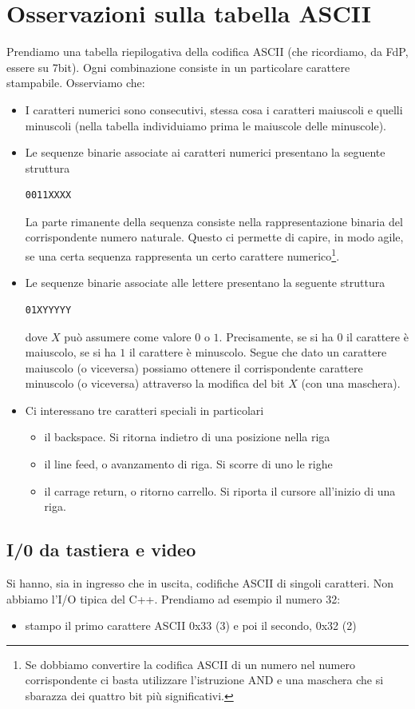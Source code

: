 \documentclass[11pt]{report}
\begin{document}
\section{Osservazioni sulla tabella ASCII}
Prendiamo una tabella riepilogativa della codifica ASCII (che ricordiamo, da FdP, essere su 7bit). Ogni combinazione consiste in un particolare carattere stampabile. Osserviamo che:
\begin{itemize}
\item I caratteri numerici sono consecutivi, stessa cosa i caratteri maiuscoli e quelli minuscoli (nella tabella individuiamo prima le maiuscole delle minuscole).
\item Le sequenze binarie associate ai caratteri numerici presentano la seguente struttura
\begin{verbatim}
0011XXXX
\end{verbatim}
La parte rimanente della sequenza consiste nella rappresentazione binaria del corrispondente numero naturale. Questo ci permette di capire, in modo agile, se una certa sequenza rappresenta un certo carattere numerico\footnote{Se dobbiamo convertire la codifica ASCII di un numero nel numero corrispondente ci basta utilizzare l'istruzione AND e una maschera che si sbarazza dei quattro bit più significativi.}.
\item Le sequenze binarie associate alle lettere presentano la seguente struttura
\begin{verbatim}
01XYYYYY
\end{verbatim}
dove $X$ può assumere come valore $0$ o $1$. Precisamente, se si ha $0$ il carattere è maiuscolo, se si ha $1$ il carattere è minuscolo. Segue che dato un carattere maiuscolo (o viceversa) possiamo ottenere il corrispondente carattere minuscolo (o viceversa) attraverso la modifica del bit $X$ (con una maschera).
\item Ci interessano tre caratteri speciali in particolari
\begin{itemize}
\item il backspace. Si ritorna indietro di una posizione nella riga
\item il line feed, o avanzamento di riga. Si scorre di uno le righe
\item il carrage return, o ritorno carrello. Si riporta il cursore all'inizio di una riga.
\end{itemize}
\end{itemize}
\subsection{I/0 da tastiera e video}
Si hanno, sia in ingresso che in uscita, codifiche ASCII di singoli caratteri. Non abbiamo l'I/O tipica del C++. Prendiamo ad esempio il numero 32:
\begin{itemize}
\item stampo il primo carattere ASCII 0x33 (3) e poi il secondo, 0x32 (2)
\end{itemize}
\end{document}
